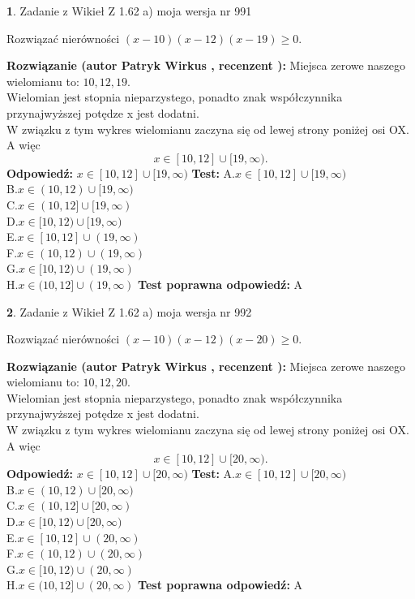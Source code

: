 \documentclass[12pt, a4paper]{article}
\theoremstyle{definition} %
\newtheorem{zad}{}
\newcommand{\zadStart}[1]{\begin{zad}#1\newline}
\newcommand{\zadStop}{\end{zad}}
\newcommand{\rozwStart}[2]{\noindent \textbf{Rozwiązanie (autor #1 , recenzent #2): }\newline}
\newcommand{\rozwStop}{\newline}
\newcommand{\odpStart}{\noindent \textbf{Odpowiedź:}\newline}
\newcommand{\odpStop}{\newline}
\newcommand{\testStart}{\noindent \textbf{Test:}\newline}
\newcommand{\testStop}{\newline}
\newcommand{\kluczStart}{\noindent \textbf{Test poprawna odpowiedź:}\newline}
\newcommand{\kluczStop}{\newline}
\begin{document}
\zadStart{Zadanie z Wikieł Z 1.62 a) moja wersja nr 991}

Rozwiązać nierówności $(x-10)(x-12)(x-19)\ge0$.
\zadStop
\rozwStart{Patryk Wirkus}{}
Miejsca zerowe naszego wielomianu to: $10, 12, 19$.\\
Wielomian jest stopnia nieparzystego, ponadto znak współczynnika przy\linebreak najwyższej potędze x jest dodatni.\\ W związku z tym wykres wielomianu zaczyna się od lewej strony poniżej osi OX. A więc $$x \in [10,12] \cup [19,\infty).$$
\rozwStop
\odpStart
$x \in [10,12] \cup [19,\infty)$
\odpStop
\testStart
A.$x \in [10,12] \cup [19,\infty)$\\
B.$x \in (10,12) \cup [19,\infty)$\\
C.$x \in (10,12] \cup [19,\infty)$\\
D.$x \in [10,12) \cup [19,\infty)$\\
E.$x \in [10,12] \cup (19,\infty)$\\
F.$x \in (10,12) \cup (19,\infty)$\\
G.$x \in [10,12) \cup (19,\infty)$\\
H.$x \in (10,12] \cup (19,\infty)$
\testStop
\kluczStart
A
\kluczStop



\zadStart{Zadanie z Wikieł Z 1.62 a) moja wersja nr 992}

Rozwiązać nierówności $(x-10)(x-12)(x-20)\ge0$.
\zadStop
\rozwStart{Patryk Wirkus}{}
Miejsca zerowe naszego wielomianu to: $10, 12, 20$.\\
Wielomian jest stopnia nieparzystego, ponadto znak współczynnika przy\linebreak najwyższej potędze x jest dodatni.\\ W związku z tym wykres wielomianu zaczyna się od lewej strony poniżej osi OX. A więc $$x \in [10,12] \cup [20,\infty).$$
\rozwStop
\odpStart
$x \in [10,12] \cup [20,\infty)$
\odpStop
\testStart
A.$x \in [10,12] \cup [20,\infty)$\\
B.$x \in (10,12) \cup [20,\infty)$\\
C.$x \in (10,12] \cup [20,\infty)$\\
D.$x \in [10,12) \cup [20,\infty)$\\
E.$x \in [10,12] \cup (20,\infty)$\\
F.$x \in (10,12) \cup (20,\infty)$\\
G.$x \in [10,12) \cup (20,\infty)$\\
H.$x \in (10,12] \cup (20,\infty)$
\testStop
\kluczStart
A
\kluczStop
\end{document}
